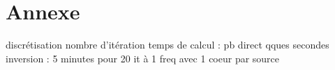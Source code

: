 \chapter*{Annexe}

discrétisation
nombre d'itération
temps de calcul : pb direct qques secondes
inversion : 5 minutes pour 20 it à 1 freq avec 1 coeur par source


%
